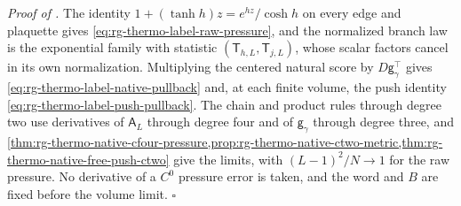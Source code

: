 \noindent\emph{Proof of .}
The identity $1+(\tanh h)z=e^{hz}/\cosh h$ on every edge and plaquette gives
\cref{eq:rg-thermo-label-raw-pressure}, and the normalized branch law is the
exponential family with statistic $(\mathsf T_{h,L},\mathsf T_{j,L})$, whose
scalar factors cancel in its own normalization. Multiplying the centered
natural score by $D\mathsf g_\gamma^\top$ gives
\cref{eq:rg-thermo-label-native-pullback} and, at each finite volume, the
push identity \cref{eq:rg-thermo-label-push-pullback}. The chain and product
rules through degree two use derivatives of $\mathsf A_L$ through degree four
and of $\mathsf g_\gamma$ through degree three, and
\cref{thm:rg-thermo-native-cfour-pressure,prop:rg-thermo-native-ctwo-metric,thm:rg-thermo-native-free-push-ctwo}
give the limits, with $(L-1)^2/N\to1$ for the raw pressure. No derivative of a
$C^0$ pressure error is taken, and the word and $B$ are fixed before the
volume limit. $\square$


